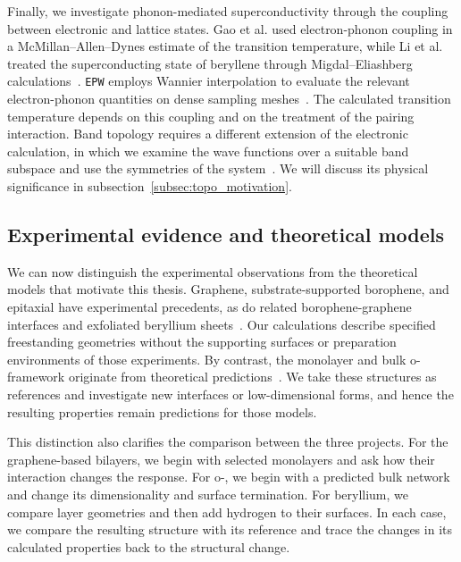 Finally, we investigate phonon-mediated superconductivity through the coupling between electronic and lattice states.
Gao et al. used electron-phonon coupling in a McMillan--Allen--Dynes estimate of the transition temperature, while Li et al. treated the superconducting state of beryllene through Migdal--Eliashberg calculations~\cite{gao2017prediction,li2023coexistence}.
\texttt{EPW} employs Wannier interpolation to evaluate the relevant electron-phonon quantities on dense sampling meshes~\cite{ponce2016epw}.
The calculated transition temperature depends on this coupling and on the treatment of the pairing interaction.
Band topology requires a different extension of the electronic calculation, in which we examine the wave functions over a suitable band subspace and use the symmetries of the system~\cite{fu2007topological}.
We will discuss its physical significance in subsection~\ref{subsec:topo_motivation}.

\FloatBarrier
\subsection{Experimental evidence and theoretical models}
\label{subsec:lit_critical_status}

We can now distinguish the experimental observations from the theoretical models that motivate this thesis.
Graphene, substrate-supported borophene, and epitaxial  have experimental precedents, as do related borophene-graphene interfaces and exfoliated beryllium sheets~\cite{novoselov2004electric,mannix2015synthesis,feng2016experimental,tanaka2005novel,liu2019borophene,chahal2023beryllene}.
Our calculations describe specified freestanding geometries without the supporting surfaces or preparation environments of those experiments.
By contrast, the  monolayer and bulk o- framework originate from theoretical predictions~\cite{tian2019,han2023superconducting}.
We take these structures as references and investigate new interfaces or low-dimensional forms, and hence the resulting properties remain predictions for those models.

This distinction also clarifies the comparison between the three projects.
For the graphene-based bilayers, we begin with selected monolayers and ask how their interaction changes the response.
For o-, we begin with a predicted bulk network and change its dimensionality and surface termination.
For beryllium, we compare layer geometries and then add hydrogen to their surfaces.
In each case, we compare the resulting structure with its reference and trace the changes in its calculated properties back to the structural change.

